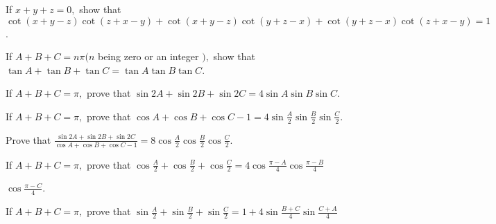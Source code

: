 \item If $x + y + z = 0,$ show that $\cot(x + y - z)\cot(z + x - y) + \cot(x + y - z)\cot(y + z - x) + \cot(y + z -
  x)\cot(z + x - y) = 1$.
\item If $A + B + C = n\pi(n$ being zero or an integer $),$ show that $\tan A + \tan B + \tan C = \tan A\tan B\tan
  C$.
\item If $A + B + C = \pi,$ prove that $\sin 2A + \sin 2B + \sin 2C = 4\sin A\sin B\sin C$.
\item If $A + B + C = \pi,$ prove that $\cos A + \cos B + \cos C - 1 = 4\sin \frac{A}{2}\sin \frac{B}{2}\sin \frac{C}{2}$.
\item Prove that $\frac{\sin 2A + \sin 2B + \sin 2C}{\cos A + \cos B + \cos C - 1} =
  8\cos\frac{A}{2}\cos\frac{B}{2}\cos\frac{C}{2}$.
\item If $A + B + C = \pi,$ prove that $\cos\frac{A}{2} + \cos\frac{B}{2} + \cos\frac{C}{2} = 4\cos\frac{\pi -
  A}{4}\cos\frac{\pi - B}{4}$

  $\cos\frac{\pi - C}{4}$.
\item If $A + B + C = \pi,$ prove that $\sin \frac{A}{2} + \sin \frac{B}{2} + \sin \frac{C}{2} = 1 + 4\sin \frac{B +
  C}{4}\sin \frac{C + A}{4}$

